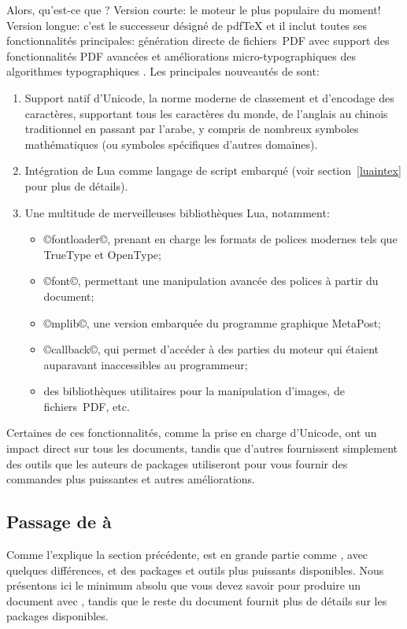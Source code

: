 \documentclass{lltxdoc}
\begin{document}
Alors, qu'est-ce que \luatex? Version courte: le moteur \tex le plus
populaire du moment!
Version longue: c'est le successeur désigné de pdfTeX et il inclut
toutes ses fonctionnalités principales: génération directe de fichiers~PDF
avec support des fonctionnalités PDF avancées et améliorations
micro-typographiques des algorithmes typographiques \tex.
Les principales nouveautés de \luatex sont:
\begin{enumerate}
  \item Support natif d'Unicode, la norme moderne de classement et
    d'encodage des caractères, supportant tous les caractères du monde,
    de l'anglais au chinois traditionnel en passant par l'arabe,
    y compris de nombreux symboles mathématiques (ou symboles
    spécifiques d'autres domaines).
  \item Intégration de Lua comme langage de script embarqué
    (voir section~\ref{luaintex} pour plus de détails).
  \item Une multitude de merveilleuses bibliothèques Lua, notamment:
    \begin{itemize}
      \item ©fontloader©, prenant en charge les formats de polices modernes
        tels que TrueType et OpenType;
      \item ©font©, permettant une manipulation avancée des polices à partir
        du document;
      \item ©mplib©, une version embarquée du programme graphique MetaPost;
      \item ©callback©, qui permet d'accéder à des parties du moteur \tex
        qui étaient auparavant inaccessibles au programmeur;
      \item des bibliothèques utilitaires pour la manipulation d'images,
        de fichiers~PDF, etc.
    \end{itemize}
\end{enumerate}
Certaines de ces fonctionnalités, comme la prise en charge d'Unicode, ont un
impact direct sur tous les documents, tandis que d'autres fournissent simplement
des outils que les auteurs de packages utiliseront pour vous fournir des commandes
plus puissantes et autres améliorations.


\subsection{Passage de \latex à \lualatex}\label{switch}

Comme l'explique la section précédente, \lualatex{} est en grande partie comme \latex,
avec quelques différences, et des packages et outils plus puissants disponibles.
Nous présentons ici le minimum absolu que vous devez savoir pour produire
un document avec \lualatex, tandis que le reste du document fournit
plus de détails sur les packages disponibles.
\end{document}
